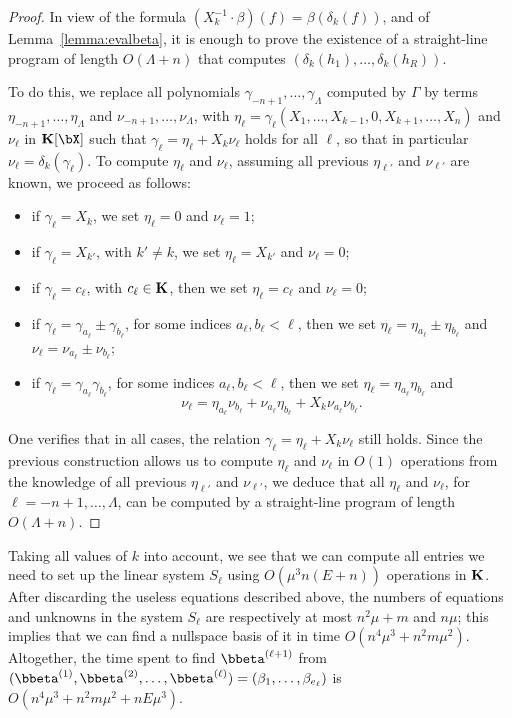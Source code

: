 \documentclass[12pt]{article}
\begin{document}
\begin{proof}
  In view of the formula $(X_k^{-1} \cdot
  \beta)(f)=\beta(\delta_k(f))$, and of Lemma~\ref{lemma:evalbeta}, it is
  enough to prove the existence of a straight-line program of length
  $O(\Lambda+n)$ that computes $(\delta_k(h_1),\dots,\delta_k(h_R))$.

  To do this, we replace all polynomials
  $\gamma_{-n+1},\dots,\gamma_\Lambda$ computed by $\Gamma$ by terms
  $\eta_{-n+1},\dots,\eta_\Lambda$ and $\nu_{-n+1},\dots,\nu_\Lambda$,
  with
  $\eta_\ell=\gamma_\ell(X_1,\dots,X_{k-1},0,X_{k+1},\dots,X_n)$
  and $\nu_\ell$ in $\KK[\bX]$ such that
  $\gamma_\ell= \eta_\ell+X_k \nu_\ell$ holds for all $\ell$, so
  that in particular $\nu_\ell=\delta_k(\gamma_\ell)$.  To compute
  $\eta_\ell$ and $\nu_\ell$, assuming all previous
  $\eta_{\ell'}$ and $\nu_{\ell'}$ are known, we proceed as
  follows:
  \begin{itemize}
  \item if $\gamma_\ell=X_k$, we set $\eta_\ell=0$ and $\nu_\ell=1$;
  \item if $\gamma_\ell=X_{k'}$, with $k' \ne k$, we set $\eta_\ell=X_{k'}$ and $\nu_\ell=0$;
  \item if $\gamma_\ell =c_\ell$, with $c_\ell \in \mathbf{K}$,
    then we set $\eta_\ell=c_\ell$ and  $\nu_\ell=0$;
  \item if $\gamma_\ell = \gamma_{a_\ell} \pm \gamma_{b_\ell}$,
    for some indices $a_\ell,b_\ell < \ell$, 
    then we set $\eta_\ell=\eta_{a_\ell}\pm\eta_{b_\ell}$
    and $\nu_\ell=\nu_{a_\ell}\pm\nu_{b_\ell}$;
\item if $\gamma_\ell = \gamma_{a_\ell} \gamma_{b_\ell}$,
      for some indices $a_\ell,b_\ell < \ell$,
    then we set $\eta_\ell=\eta_{a_\ell} \eta_{b_\ell}$
    and $$\nu_\ell=
\eta_{a_\ell} \nu_{b_\ell}
+
\nu_{a_\ell} \eta_{b_\ell}
+
X_k\nu_{a_\ell} \nu_{b_\ell}.$$
\end{itemize}
One verifies that in all cases, the relation $\gamma_\ell=
\eta_\ell+X_k \nu_\ell$ still holds. Since the previous
construction allows us to compute $\eta_\ell$ and $\nu_\ell$ in
$O(1)$ operations from the knowledge of all previous $\eta_{\ell'}$
and $\nu_{\ell'}$, we deduce that all $\eta_\ell$ and $\nu_\ell$,
for $\ell=-n+1,\dots,\Lambda$, can be computed by a straight-line program of
length $O(\Lambda+n)$.
\end{proof}

Taking all values of $k$ into account, we see that we can compute all
entries we need to set up the linear system $S_\ell$ using $O(\mu^3
n(E+n))$ operations in $\mathbf{K}$. After discarding the useless equations
described above, the numbers of equations and unknowns in the system
$S_\ell$ are respectively at most $n^2 \mu+m$ and $n \mu$; this
implies that we can find a nullspace basis of it in time $O(n^4 \mu^3
+ n^2 m \mu^2)$. Altogether, the time spent to find
$\bbeta^{(\ell+1)}$ from
$(\bbeta^{(1)},\bbeta^{(2)},\dots,\bbeta^{(\ell)})=(\beta_{1},\dots,\beta_{e_\ell})$
is $O(n^4 \mu^3 + n^2 m \mu^2 + n E \mu^3)$.
\end{document}
